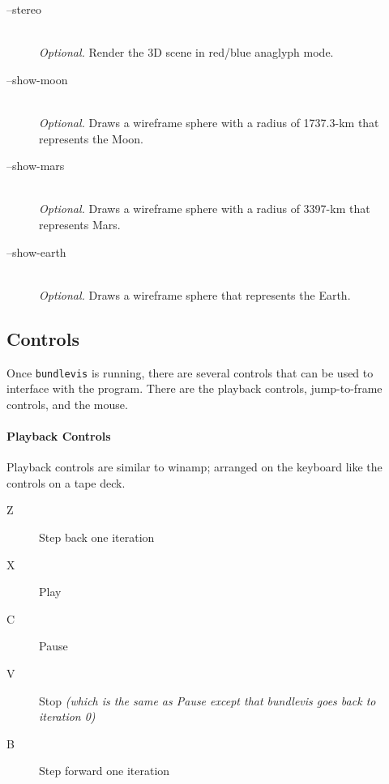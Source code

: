 \begin{description}
\item[--stereo] \hfill \\
  \emph{Optional.} Render the 3D scene in red/blue anaglyph mode.

\item[--show-moon] \hfill \\
  \emph{Optional.} Draws a wireframe sphere with a radius of 1737.3-km
  that represents the Moon.

\item[--show-mars] \hfill \\
  \emph{Optional.} Draws a wireframe sphere with a radius of 3397-km
  that represents Mars.

\item[--show-earth] \hfill \\
  \emph{Optional.} Draws a wireframe sphere that represents the Earth.

\end{description}

\subsection{Controls}

Once \texttt{bundlevis} is running, there are several controls that
can be used to interface with the program. There are the playback
controls, jump-to-frame controls, and the mouse.

\paragraph{Playback Controls}

Playback controls are similar to winamp; arranged on the keyboard like
the controls on a tape deck.

\newenvironment{myindentpar}[1]
               {\begin{list}{}
                   {\setlength{\leftmargin}{#1}}
                 \item[]
               }
               {\end{list}}

\begin{myindentpar}{3cm}
\begin{description}
  \item[Z] Step back one iteration
  \item[X] Play
  \item[C] Pause
  \item[V] Stop \emph{(which is the same as Pause except that
    bundlevis goes back to iteration 0)}
  \item[B] Step forward one iteration
\end{description}
\end{myindentpar}

